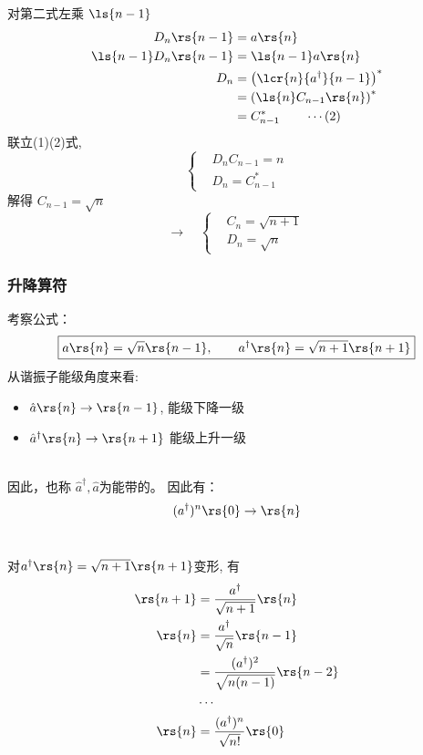     \begin{frame}
        \frametitle{}
对第二式左乘 $ \ls{n-1}  $ 
      \[ 
        \begin{aligned}
            D_n\rs{n-1} &= a \rs{n} \\
            \ls{n-1} D_n\rs{n-1} &=  \ls{n-1} a \rs{n} \\
          D_n &= \left(\lcr{n}{a^\dagger }{n-1}\right)^* \\
          &=  \left(\ls{n}C_{n-1}\rs{n}\right)^* \\
          &= C_{n-1} ^*   \qquad \cdots (2)
        \end{aligned}
        \] 
        联立(1)(2)式, 
        \[ \left\{
            \begin{aligned}
                &D_n C_{n-1}=n \\
                &D_n = C_{n-1} ^* 
            \end{aligned}\right.
            \]       
        解得 $C_{n-1}=\sqrt{n} \quad $  $$ \to \quad \left\{
          \begin{aligned}
              &C_{n}=\sqrt{n+1} \\
              &D_n = \sqrt{n}  
          \end{aligned}\right. $$   
\end{frame}

\begin{frame}[label=current]
  \frametitle{升降算符}
考察公式：
$$\boxed{ {a \rs{n}= \sqrt{n}\rs{n-1}}, \qquad a^\dagger \rs{n}= \sqrt{n+1} \rs{n+1}}$$
从谐振子能级角度来看:
\begin{itemize}
    \item $\hat{a}\rs{n} \to \rs{n-1} $, 能级下降一级
    \item $\hat{a}^\dagger \rs{n} \to \rs{n+1} $ 能级上升一级
\end{itemize}
~~\\ 
因此，也称 $\hat{a}^\dagger, \hat{a} $为能带的\emf[升降算符] 。 因此有：
\[ (a^\dagger)^n \rs{0} \to \rs{n} \]

\end{frame} 

\begin{frame}
    \frametitle{}
    ~~\\ 
    \证 对$  a^\dagger \rs{n}= \sqrt{n+1} \rs{n+1}  $变形, 有 
    \[ 
  \begin{aligned}
      \rs{n+1} &= \frac{a^\dagger }{\sqrt{n+1}} \rs{n} \\
      \rs{n} &= \frac{a^\dagger }{\sqrt{n}} \rs{n-1} \\
             &= \frac{(a^\dagger)^2 }{\sqrt{n(n-1)}} \rs{n-2} \\
             & \cdots \\
      \rs{n} &= \frac{(a^\dagger)^n }{\sqrt{n!}} \rs{0} \\
  \end{aligned}    
    \]
\end{frame}

